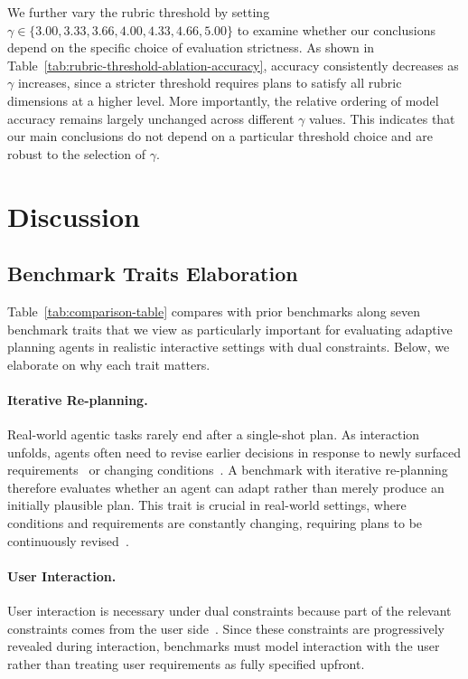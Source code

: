 We further vary the rubric threshold by setting $\gamma \in \{3.00, 3.33, 3.66, 4.00, 4.33, 4.66, 5.00\}$ to examine whether our conclusions depend on the specific choice of evaluation strictness. 
As shown in Table~\ref{tab:rubric-threshold-ablation-accuracy}, accuracy consistently decreases as $\gamma$ increases, since a stricter threshold requires plans to satisfy all rubric dimensions at a higher level. 
More importantly, the relative ordering of model accuracy remains largely unchanged across different $\gamma$ values. 
This indicates that our main conclusions do not depend on a particular threshold choice and are robust to the selection of $\gamma$.

\section{Discussion}
\label{app:discussion}

\subsection{Benchmark Traits Elaboration}
\label{app:traits-exp}

Table~\ref{tab:comparison-table} compares \bench{} with prior benchmarks along seven benchmark traits that we view as particularly important for evaluating adaptive planning agents in realistic interactive settings with dual constraints.
Below, we elaborate on why each trait matters.

\paragraph{Iterative Re-planning.}
Real-world agentic tasks rarely end after a single-shot plan. As interaction unfolds, agents often need to revise earlier decisions in response to newly surfaced requirements~\citep{tau-bench} or changing conditions~\citep{costbench}. 
A benchmark with iterative re-planning therefore evaluates whether an agent can adapt rather than merely produce an initially plausible plan. 
This trait is crucial in real-world settings, where conditions and requirements are constantly changing, requiring plans to be continuously revised~\citep{xiao2025dynamictheorymindevaluating}.

\paragraph{User Interaction.}
User interaction is necessary under dual constraints because part of the relevant constraints comes from the user side~\citep{FlowBench}. 
Since these constraints are progressively revealed during interaction, benchmarks must model interaction with the user rather than treating user requirements as fully specified upfront.

